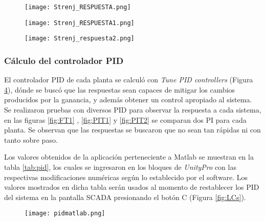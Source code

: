 {\begin{comment}
 dónde el motor no era esforzado a calentarse ni la bomba era sobreexigida

escalones ubicados en la parte central del rango útil estipulado .

 además obtener un control apropiado al sistema: algo no muy rapido ni muy lento
\end{comment}


\begin{figure}[htb]
	\centering
	\texttt{[image: Strenj\_RESPUESTA.png]}
	\label{fig:FT01}
\end{figure}
\begin{figure}[htb]
	\centering
	\texttt{[image: Strenj\_RESPUESTA1.png]}
	\label{fig:PIT01}
\end{figure}




\begin{figure}[htb]
	\centering
	\texttt{[image: Strenj\_respuesta2.png]}
	\label{fig:PIT02}
\end{figure}






\subsubsection{Cálculo del controlador PID}
El controlador PID de cada planta se calculó con \textit{Tune PID controllers} (Figura \ref{fig:PIDcontr}), dónde se buscó que las respuestas sean capaces de mitigar los cambios producidos por la ganancia, y además obtener un control apropiado al sistema. \\
Se realizaron pruebas con diversos PID para observar la respuesta a cada sistema, en las figuras \ref{fig:FT1} , \ref{fig:PIT1} y \ref{fig:PIT2} se comparan dos PI para cada planta. Se observan que las respuestas se buscaron que no sean tan rápidas ni con tanto sobre paso.

Los valores obtenidos de la aplicación perteneciente a Matlab se muestran en la tabla \ref{tab:pid}, los cuales se ingresaron en los bloques de \textit{UnityPro} con las respectivas modificaciones numéricas según lo establecido por el software. Los valores mostrados en dicha tabla serán usados al momento de restablecer los PID del sistema en la pantalla SCADA presionando el botón C (Figura \ref{fig:LCs}).
\begin{figure}[h!]
	\centering
	\texttt{[image: pidmatlab.png]}
	\label{fig:PIDcontr}
\end{figure}

}
